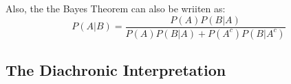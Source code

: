 Also, the the Bayes Theorem can also be wriiten as:
\begin{equation} \label{eq2}
P(A|B) = \frac{P(A)P(B|A)}{P(A)P(B|A) + P(A^c)P(B|A^c)}
\end{equation}


\subsection{The Diachronic Interpretation}


